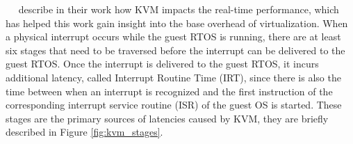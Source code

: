 \documentclass[MMR,Master,english]{twbook}
\begin{document}
\bigskip \noindent \citeauthor{maPerformanceTuningKVMbased}~\cite{maPerformanceTuningKVMbased}~\cite{junzhangPerformanceAnalysisKVMBased2010} describe in their work how KVM impacts the real-time performance, which has helped this work gain insight into the base overhead of virtualization. When a physical interrupt occurs while the guest RTOS is running, there are at least six stages that need to be traversed before the interrupt can be delivered to the guest RTOS. Once the interrupt is delivered to the guest RTOS, it incurs additional latency, called Interrupt Routine Time (IRT), since there is also the time between when an interrupt is recognized and the first instruction of the corresponding interrupt service routine (ISR) of the guest OS is started. These stages are the primary sources of latencies caused by KVM, they are briefly described in Figure \ref{fig:kvm_stages}.
\end{document}
